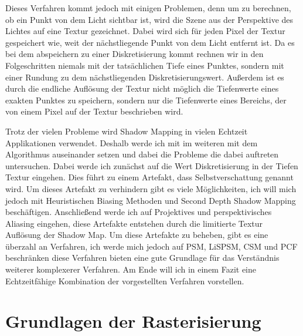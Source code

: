 Dieses Verfahren kommt jedoch mit einigen Problemen, denn um zu berechnen, ob ein Punkt von dem Licht sichtbar ist,
wird die Szene aus der Perspektive des Lichtes auf eine Textur gezeichnet.
Dabei wird sich für jeden Pixel der Textur gespeichert wie, weit der nächstliegende Punkt von dem Licht entfernt ist.
Da es bei dem abspeichern zu einer Diskretisierung kommt rechnen 
wir in den Folgeschritten niemals mit der tatsächlichen Tiefe eines Punktes,
sondern mit einer Rundung zu dem nächstliegenden Diskretisierungswert.
Außerdem ist es durch die endliche Auflösung der Textur nicht möglich die Tiefenwerte eines exakten Punktes zu speichern,
sondern nur die Tiefenwerte eines Bereichs, der von einem Pixel auf der Textur beschrieben wird.
\par
Trotz der vielen Probleme wird Shadow Mapping in vielen Echtzeit Applikationen verwendet.
Deshalb werde ich mit im weiteren mit dem Algorithmus auseinander setzen und dabei die Probleme die dabei auftreten untersuchen.
Dabei werde ich zunächst auf die Wert Diskretisierung in der Tiefen Textur eingehen.
Dies führt zu einem Artefakt, dass Selbstverschattung genannt wird. 
Um dieses Artefakt zu verhindern gibt es viele Möglichkeiten, ich will mich jedoch mit Heuristischen Biasing Methoden und Second Depth Shadow Mapping beschäftigen.
Anschließend werde ich auf Projektives und perspektivisches Aliasing eingehen, diese Artefakte entstehen durch 
die limitierte Textur Auflösung der Shadow Map.
Um diese Artefakte zu beheben, gibt es eine überzahl an Verfahren, ich werde mich jedoch auf PSM, LiSPSM, CSM und PCF beschränken 
diese Verfahren bieten eine gute Grundlage für das Verständnis weiterer komplexerer Verfahren.
Am Ende will ich in einem Fazit eine Echtzeitfähige Kombination der vorgestellten Verfahren vorstellen.



\chapter{Grundlagen der Rasterisierung}
